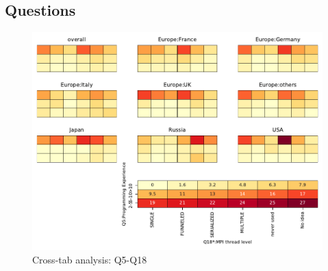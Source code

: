 
\subsection{Questions}


\begin{figure}
\begin{center}
\includegraphics[width=12cm]{../pdfs/Q5-Q18.pdf}
\caption{Cross-tab analysis: Q5-Q18}
\label{fig:Q5-Q18}
\end{center}
\end{figure}
